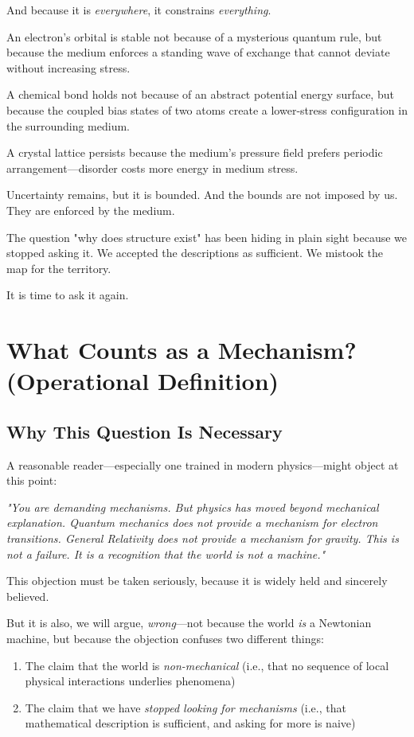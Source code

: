 \documentclass[12pt, a4paper]{article}
\begin{document}
And because it is \textit{everywhere}, it constrains \textit{everything}.

An electron's orbital is stable not because of a mysterious quantum rule, but because the medium enforces a standing wave of exchange that cannot deviate without increasing stress.

A chemical bond holds not because of an abstract potential energy surface, but because the coupled bias states of two atoms create a lower-stress configuration in the surrounding medium.

A crystal lattice persists because the medium's pressure field prefers periodic arrangement—disorder costs more energy in medium stress.

Uncertainty remains, but it is bounded. And the bounds are not imposed by us. They are enforced by the medium.

The question "why does structure exist" has been hiding in plain sight because we stopped asking it. We accepted the descriptions as sufficient. We mistook the map for the territory.

It is time to ask it again.

\section{What Counts as a Mechanism? (Operational Definition)}
\label{sec:mechanism}

\subsection{Why This Question Is Necessary}
\label{subsec:why_question}

A reasonable reader—especially one trained in modern physics—might object at this point:

\textit{"You are demanding mechanisms. But physics has moved beyond mechanical explanation. Quantum mechanics does not provide a mechanism for electron transitions. General Relativity does not provide a mechanism for gravity. This is not a failure. It is a recognition that the world is not a machine."}

This objection must be taken seriously, because it is widely held and sincerely believed.

But it is also, we will argue, \textit{wrong}—not because the world \textit{is} a Newtonian machine, but because the objection confuses two different things:

\begin{enumerate}
    \item The claim that the world is \textit{non-mechanical} (i.e., that no sequence of local physical interactions underlies phenomena)
    \item The claim that we have \textit{stopped looking for mechanisms} (i.e., that mathematical description is sufficient, and asking for more is naive)
\end{enumerate}
\end{document}
